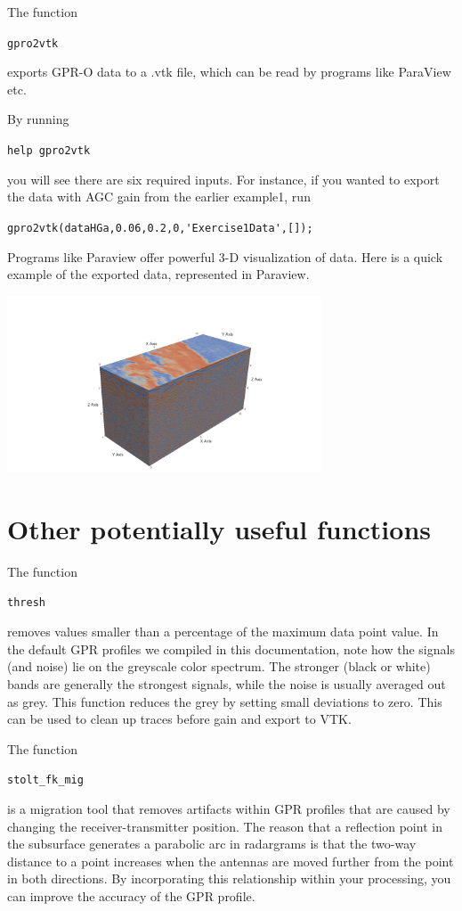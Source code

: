 \documentclass[11pt]{article}
\begin{document}
The function

\qquad \verb#gpro2vtk#

exports GPR-O data to a .vtk file, which can be
read by programs like ParaView etc.

By running

\qquad \verb#help gpro2vtk#

you will see there are six required inputs. For instance, if you
wanted to export the data with AGC gain from the earlier example1, run

\qquad \verb#gpro2vtk(dataHGa,0.06,0.2,0,'Exercise1Data',[]);#

Programs like Paraview offer powerful 3-D visualization of data.
Here is a quick example of the exported data, represented in Paraview.

\begin{center}
\includegraphics[width=0.7\textwidth, trim = 1cm 3cm 1cm
  3cm,clip]{figures/ParaviewEx.png}
\end{center}

\section{Other potentially useful functions}

The function

\qquad \verb#thresh#

removes values smaller than a percentage of the maximum data point
value. In the default GPR profiles we compiled in this documentation,
note how the signals (and noise) lie on the greyscale color spectrum. The
stronger (black or white) bands are generally the strongest signals,
while the noise is usually averaged out as grey. This function reduces
the grey by setting small deviations to zero. This can be used to 
clean up traces before gain and export to VTK.

The function

\qquad \verb#stolt_fk_mig#

is a migration tool that removes artifacts within GPR profiles that are
caused by changing the receiver-transmitter position. The reason that a
reflection point in the subsurface generates a parabolic arc in radargrams
is that the two-way distance to a point increases when the antennas are moved
further from the point in both directions. By incorporating this relationship
within your processing, you can improve the accuracy of the GPR profile.
\end{document}
